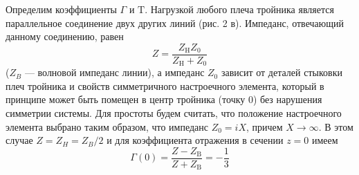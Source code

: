 ﻿\documentclass[a4paper,11pt]{article}
\begin{document}
Определим коэффициенты $\Gamma$ и $\mathrm { T }$. Нагрузкой любого плеча тройника является параллельное соединение двух других линий (рис. 2 в). Импеданс, отвечающий данному соединению, равен 
\begin{equation*}
	Z = \frac { Z _ { \mathrm { H } } Z _ { 0 } } { Z _ { \mathrm { H } } + Z _ { 0 } }
\end{equation*}
($Z_B$ --- волновой импеданс линии), а импеданс $Z_0$ зависит от деталей стыковки плеч тройника и свойств симметричного настроечного элемента, который в принципе может быть помещен в центр тройника (точку 0) без нарушения симметрии системы. 
Для простоты будем считать, что положение настроечного элемента выбрано таким образом, что импеданс $Z_0=iX$, причем $X\to\infty$. В этом случае $Z = Z_H = Z_B/2$ и для коэффициента
отражения в сечении $z=0$ имеем
\begin{equation}
	\Gamma ( 0 ) = \frac { Z - Z _ { \mathrm { B } } } { Z + Z _ { \mathrm { B } } } = - \frac { 1 } { 3 }
\end{equation}

\end{document}
